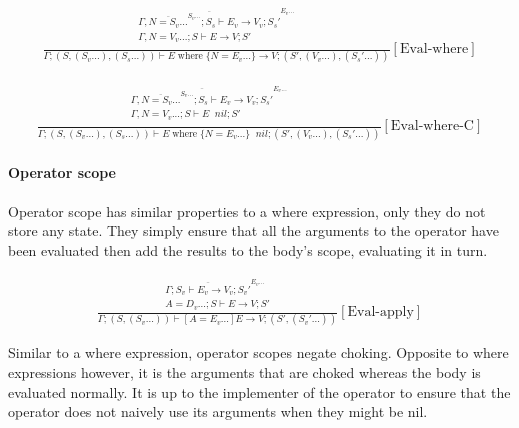\documentclass{scrartcl}
\DeclareMathOperator{\where}{where}
\DeclareMathOperator{\ceval}{\overset{C}{\rightarrow}}
\begin{document}
    \begin{align*}
    \frac{
        \begin{matrix}
        \overline{\Gamma, \overline{N=S_v...}^{S_v...}; S_s \vdash E_v \rightarrow V_v; S_s'}^{E_v...} \\
        \Gamma, N=V_v...; S \vdash E \rightarrow V; S' \\
        \end{matrix}
    }{
        \Gamma; (S, (S_v...), (S_s...)) \vdash E \where \{ N=E_v... \} \rightarrow V; (S', (V_v...), (S_s'...))
    }[\text{Eval-where}]
    \end{align*}
    
    \begin{align*}
    \frac{
        \begin{matrix}
        \overline{\Gamma, \overline{N=S_v...}^{S_v...}; S_s \vdash E_v \rightarrow V_v; S_s'}^{E_v...} \\
        \Gamma, N=V_v...; S \vdash E \ceval nil; S' \\
        \end{matrix}
    }{
        \Gamma; (S, (S_v...), (S_s...)) \vdash E \where \{ N=E_v... \} \ceval nil; (S', (V_v...), (S_s'...))
    }[\text{Eval-where-C}]
    \end{align*}
    
    \paragraph{Operator scope}
    
    Operator scope has similar properties to a where expression, only they do not store any state. They simply ensure that all the arguments to the operator have been evaluated then add the results to the body's scope, evaluating it in turn.
    
    \begin{align*}
    \frac{
        \begin{matrix}
        \overline{\Gamma; S_v \vdash E_v \rightarrow V_v; S_v'}^{E_v...} \\
        A = D_v...; S \vdash E \rightarrow V; S'
        \end{matrix}
    }{
        \Gamma; (S, (S_v...)) \vdash [A=E_v...]E \rightarrow V; (S', (S_v'...))
    }[\text{Eval-apply}]
    \end{align*}
    
    Similar to a where expression, operator scopes negate choking. Opposite to where expressions however, it is the arguments that are choked whereas the body is evaluated normally. It is up to the implementer of the operator to ensure that the operator does not naively use its arguments when they might be nil.
    
\end{document}
